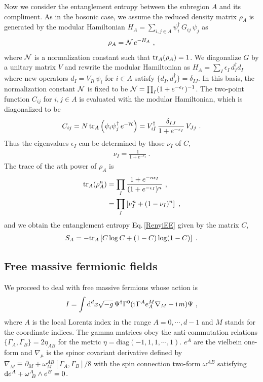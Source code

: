 Now we consider the entanglement entropy between the subregion $A$ and its compliment.
As in the bosonic case, we assume the reduced density matrix $\rho_A$ is generated by the modular Hamiltonian $H_A= \sum_{i,j \in A} \psi_i^\dagger\, G_{ij}\, \psi_j$ \cite{2003JPhA...36L.205P} as 
\begin{align}
	\rho_A = {\cal N}\, e^{-H_A} \ ,
\end{align}
where ${\cal N}$ is a normalization constant such that ${\rm tr}_A (\rho_A) = 1$.
We diagonalize $G$ by a unitary matrix $V$ and rewrite the modular Hamiltonian as $H_A= \sum_{I} \epsilon_I \, d_I^\dagger d_I$ where new operators $d_I = V_{Ii} \,\psi_i$ for $i\in A$ satisfy $\{ d_I, d_J^\dagger \} = \delta_{IJ}$.
In this basis, the normalization constant ${\cal N}$ is fixed to be ${\cal N} = \prod_{I} (1+ e^{-\epsilon_I})^{-1}$.
The two-point function $C_{ij}$ for $i,j\in A$ is evaluated with the modular Hamiltonian, which is diagonalized to be
\begin{align}
	C_{ij} = N\,{\rm tr}_A \left( \psi_i \psi_j^\dagger \, e^{-{\cal H}}\right) = V^\dagger_{iI} \,\frac{\delta_{IJ}}{1 + e^{-\epsilon_I}}\, V_{Jj} \ .
\end{align}
Thus the eigenvalues $\epsilon_I$ can be determined by those $\nu_I$ of $C$,
\begin{align}
	\nu_I =\frac{1}{1 + e^{-\epsilon_I}} \ .
\end{align}
The trace of the $n$th power of $\rho_A$ is
\begin{align}
\begin{aligned}
	{\rm tr}_A(\rho_A^n) &= \prod_I \frac{1+ e^{-n \epsilon_I}}{(1+ e^{-\epsilon_I})^n}\ , \\
		&= \prod_I \left[ \nu_I^n + (1 - \nu_I)^n \right] \ ,
\end{aligned}
\end{align}
and we obtain the entanglement entropy Eq.\,\eqref{RenyiEE} given by the matrix $C$,
\begin{align}\label{FermCformula}
	S_A = - {\rm tr}_A \left[ C \log C + (1-C) \log (1-C) \right] \ .
\end{align}


\subsection{Free massive fermionic fields}
We proceed to deal with free massive fermions whose action is
\begin{align}
	I = \int \mathrm{d}^dx\sqrt{-g} \, \Psi^\dagger \Gamma^0(\mathrm{i}\,  \Gamma^A e_A^M \nabla_M - \mathrm{i}\, m ) \Psi  \ ,
\end{align}
where $A$ is the local Lorentz index in the range $A = 0,\cdots, d-1$ and $M$ stands for the coordinate indices.
The gamma matrices obey the anti-commutation relations $\{ \Gamma_A, \Gamma_B\} = 2\eta_{AB}$ for the metric $\eta = \text{diag} (-1, 1, 1, \cdots, 1)$.
$e^A$ are the vielbein one-form and $\nabla_\mu$ is the spinor covariant derivative defined by $\nabla_M \equiv \partial_M + \omega_M^{AB}[\Gamma_A, \Gamma_B]/8$ with the spin connection two-form $\omega^{AB}$ satisfying $\mathrm{d} e^A + \omega^{A}_{~B}\wedge e^B = 0$.

